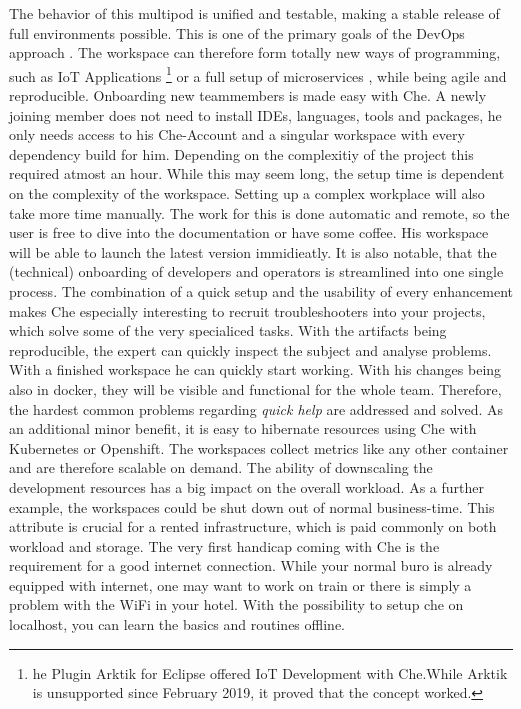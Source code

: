 \documentclass[utf8]{lni}
\begin{document}
The behavior of this multipod is unified and testable, making a stable release of full environments possible. 
This is one of the primary goals of the DevOps approach \cite{JA16}. 
The workspace can therefore form totally new ways of programming, such as IoT Applications \footnote{he Plugin Arktik for Eclipse offered IoT Development with Che.While Arktik is unsupported since February 2019, it proved that the concept worked.} or a full setup of microservices \cite{IV18}, while being agile and reproducible.
Onboarding new teammembers is made easy with Che. 
A newly joining member does not need to install IDEs, languages, tools and packages, he only needs access to his Che-Account and a singular workspace with every dependency build for him.
Depending on the complexitiy of the project this required atmost an hour. 
While this may seem long, the setup time is dependent on the complexity of the workspace. 
Setting up a complex workplace will also take more time manually. 
The work for this is done automatic and remote, so the user is free to dive into the documentation or have some coffee. 
His workspace will be able to launch the latest version immidieatly.
It is also notable, that the (technical) onboarding of developers and operators is streamlined into one single process. 
The combination of a quick setup and the usability of every enhancement makes Che especially interesting to recruit troubleshooters into your projects, which solve some of the very specialiced tasks.  
With  the  artifacts  being  reproducible,  the  expert  can quickly inspect the subject and analyse problems.
With a finished workspace he can quickly start working. 
With his changes being also in docker, they will be visible and functional for the whole team.
Therefore,  the  hardest  common  problems  regarding \textit{quick help} are addressed and solved. 
As an additional minor benefit, it is easy to hibernate resources  using  Che  with  Kubernetes  or  Openshift.
The workspaces collect metrics like any other container and are therefore scalable on demand. 
The ability of downscaling the development resources has a big impact on the overall 
workload. 
As a further example, the workspaces could be shut down out of normal business-time. This attribute is crucial for a rented infrastructure, which is paid commonly on both workload and storage.  
The very first handicap coming with Che is the requirement for a good internet connection. 
While your normal buro is already equipped with internet, one may want to work on train or there is simply a problem with the WiFi in your hotel.
With the possibility to setup che on localhost, you can learn the basics and routines offline. 
\end{document}
